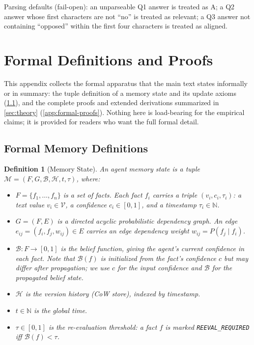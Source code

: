 \documentclass{article}
\newtheorem{definition}[theorem]{Definition}
\theoremstyle{definition}
\begin{document}
Parsing defaults (fail-open): an unparseable Q1 answer is treated as
A; a Q2 answer whose first characters are not ``no'' is treated as
relevant; a Q3 answer not containing ``opposed'' within the first
four characters is treated as aligned.

\section{Formal Definitions and Proofs}
\label{app:formal}

This appendix collects the formal apparatus that the main text states
informally or in summary: the tuple definition of a memory state and its
update axioms (\cref{app:formal-defs}), and the complete proofs and
extended derivations summarized in \cref{sec:theory}
(\cref{app:formal-proofs}).  Nothing here is load-bearing for the
empirical claims; it is provided for readers who want the full formal
detail.

\subsection{Formal Memory Definitions}
\label{app:formal-defs}

\begin{definition}[Memory State]
\label{def:memory}
An agent memory state is a tuple $\mathcal{M} = (F, G, \mathcal{B},
\mathcal{H}, t, \tau)$, where:
\begin{itemize}
\item $F = \{f_1, \dots, f_n\}$ is a set of \emph{facts}.  Each fact
  $f_i$ carries a triple $(v_i, c_i, \tau_i)$: a text value
  $v_i\in\mathcal{V}$, a confidence $c_i\in[0,1]$, and a timestamp
  $\tau_i\in\mathbb{N}$.
\item $G = (F, E)$ is a directed acyclic \emph{probabilistic dependency
  graph}.  An edge $e_{ij} = (f_i, f_j, w_{ij})\in E$ carries an
  edge dependency weight $w_{ij} = P(f_j \mid f_i)$.
\item $\mathcal{B}: F\to[0,1]$ is the \emph{belief function}, giving
  the agent's current confidence in each fact.  Note that $\mathcal{B}(f)$
  is initialized from the fact's confidence $c$ but may differ after
  propagation; we use $c$ for the input confidence and $\mathcal{B}$ for
  the propagated belief state.
\item $\mathcal{H}$ is the \emph{version history} (CoW store),
  indexed by timestamp.
\item $t\in\mathbb{N}$ is the global time.
\item $\tau\in[0,1]$ is the \emph{re-evaluation threshold}: a fact
  $f$ is marked \texttt{REEVAL\_REQUIRED} iff $\mathcal{B}(f) < \tau$.
\end{itemize}
\end{definition}
\end{document}
